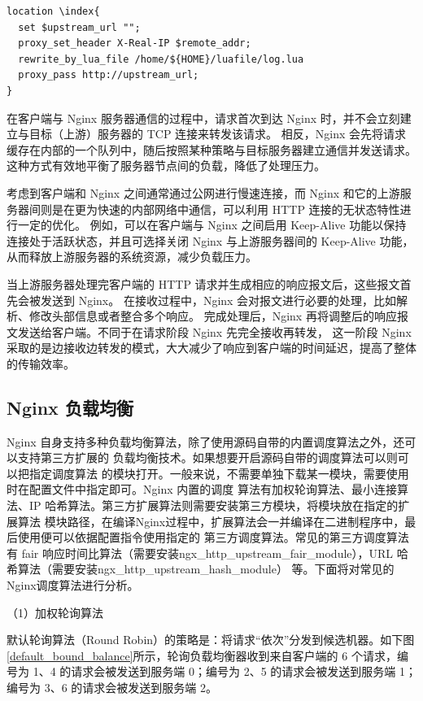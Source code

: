 \noindent \begin{lstlisting}[caption={Nginx 反向代理默认配置}]
location \index{
  set $upstream_url "";
  proxy_set_header X-Real-IP $remote_addr;
  rewrite_by_lua_file /home/${HOME}/luafile/log.lua
  proxy_pass http://upstream_url;
}
\end{lstlisting}

在客户端与 Nginx 服务器通信的过程中，请求首次到达 Nginx 时，并不会立刻建立与目标（上游）服务器的 TCP 连接来转发该请求。
相反，Nginx 会先将请求缓存在内部的一个队列中，随后按照某种策略与目标服务器建立通信并发送请求。
这种方式有效地平衡了服务器节点间的负载，降低了处理压力。

考虑到客户端和 Nginx 之间通常通过公网进行慢速连接，而 Nginx 和它的上游服务器间则是在更为快速的内部网络中通信，可以利用 HTTP 连接的无状态特性进行一定的优化。
例如，可以在客户端与 Nginx 之间启用 Keep-Alive 功能以保持连接处于活跃状态，并且可选择关闭 Nginx 与上游服务器间的 Keep-Alive 功能，从而释放上游服务器的系统资源，减少负载压力。

当上游服务器处理完客户端的 HTTP 请求并生成相应的响应报文后，这些报文首先会被发送到 Nginx。
在接收过程中，Nginx 会对报文进行必要的处理，比如解析、修改头部信息或者整合多个响应。
完成处理后，Nginx 再将调整后的响应报文发送给客户端。不同于在请求阶段 Nginx 先完全接收再转发，
这一阶段 Nginx 采取的是边接收边转发的模式，大大减少了响应到客户端的时间延迟\cite{邓仲举2012高可靠性集群部署的设计与实现}，提高了整体的传输效率。

\subsection{Nginx 负载均衡}

Nginx 自身支持多种负载均衡算法，除了使用源码自带的内置调度算法之外，还可以支持第三方扩展的
负载均衡技术\cite{sufiev2016dynamic}。如果想要开启源码自带的调度算法可以则可以把指定调度算法
的模块打开。一般来说，不需要单独下载某一模块，需要使用时在配置文件中指定即可。Nginx 内置的调度
算法有加权轮询算法、最小连接算法、IP 哈希算法。第三方扩展算法则需要安装第三方模块，将模块放在指定的扩展算法
模块路径，在编译Nginx过程中，扩展算法会一并编译在二进制程序中，最后使用便可以依据配置指令使用指定的
第三方调度算法。常见的第三方调度算法有 fair 响应时间比算法（需要安装ngx\_http\_upstream\_fair\_module），URL 哈希算法（需要安装ngx\_http\_upstream\_hash\_module）
等。下面将对常见的Nginx调度算法进行分析。

（1）加权轮询算法

默认轮询算法（Round Robin）的策略是：将请求“依次”分发到候选机器。如下图\ref{default_bound_balance}所示，轮询负载均衡器收到来自客户端的 6 个请求，编号为 1、4 的请求会被发送到服务端 0；编号为 2、5 的请求会被发送到服务端 1；编号为 3、6 的请求会被发送到服务端 2。

